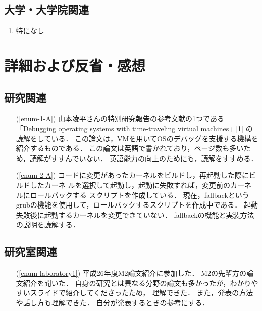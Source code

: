 \documentclass[fleqn, 14pt]{extarticle}
\begin{document}
\subsection{大学・大学院関連}
\label{sec-2-3}

\begin{enumerate}
\item 特になし
\hfill
\label{enum-univ2}
\end{enumerate}





\section{詳細および反省・感想}
\label{sec-3}
\subsection{研究関連}
\label{sec-3-1}

\begin{itemize}
\item[(\ref{enum-1-A})]
山本凌平さんの特別研究報告の参考文献の1つである「Debugging operating systems with time-traveling virtual machines」[1]
の読解をしている．
この論文は，VMを用いてOSのデバッグを支援する機構を紹介するものである．
この論文は英語で書かれており，ページ数も多いため，読解がすすんでいない．
英語能力の向上のためにも，読解をすすめる．
\item[(\ref{enum-2-A})]
コードに変更があったカーネルをビルドし，再起動した際にビルドしたカーネ
ルを選択して起動し，起動に失敗すれば，変更前のカーネルにロールバックする
スクリプトを作成している．
現在，fallbackというgrubの機能を使用して，ロールバックするスクリプトを作成中である．
起動失敗後に起動するカーネルを変更できていない．
fallbackの機能と実装方法の説明を読解する．
\end{itemize}

\subsection{研究室関連}
\label{sec-3-2}
\begin{itemize}
\item[(\ref{enum-laboratory1})]
平成26年度M2論文紹介に参加した．
M2の先輩方の論文紹介を聞いた．
自身の研究とは異なる分野の論文も多かったが，わかりやすいスライドで紹介してくださったため，
理解できた．
また，発表の方法や話し方も理解できた．
自分が発表するときの参考にする．

\end{itemize}
\end{document}
